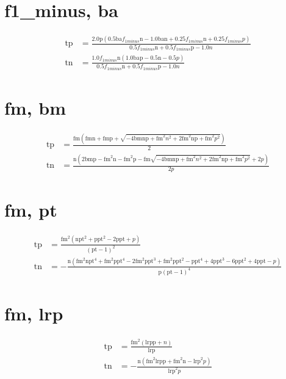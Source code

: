 \documentclass[3p,times]{elsarticle}
\begin{document}
\begin{footnotesize}
\begin{landscape}
\section{f1_minus, ba}
\begin{align}
\mathrm{tp} &= \frac{2.0 \mathrm{p} \left(0.5 \mathrm{ba} f_{1 minus} \mathrm{n} - 1.0 \mathrm{ba} \mathrm{n} + 0.25 f_{1 minus} \mathrm{n} + 0.25 f_{1 minus} p\right)}{0.5 f_{1 minus} \mathrm{n} + 0.5 f_{1 minus} \mathrm{p} - 1.0 n}\\
\mathrm{tn} &= \frac{1.0 f_{1 minus} \mathrm{n} \left(1.0 \mathrm{ba} \mathrm{p} - 0.5 \mathrm{n} - 0.5 p\right)}{0.5 f_{1 minus} \mathrm{n} + 0.5 f_{1 minus} \mathrm{p} - 1.0 n}
\end{align}
\section{fm, bm}
\begin{align}
\mathrm{tp} &= \frac{\mathrm{fm} \left(\mathrm{fm} \mathrm{n} + \mathrm{fm} \mathrm{p} + \sqrt{- 4 \mathrm{bm} \mathrm{n} \mathrm{p} + \mathrm{fm}^{2} n^{2} + 2 \mathrm{fm}^{2} \mathrm{n} \mathrm{p} + \mathrm{fm}^{2} p^{2}}\right)}{2}\\
\mathrm{tn} &= \frac{\mathrm{n} \left(2 \mathrm{bm} \mathrm{p} - \mathrm{fm}^{2} \mathrm{n} - \mathrm{fm}^{2} \mathrm{p} - \mathrm{fm} \sqrt{- 4 \mathrm{bm} \mathrm{n} \mathrm{p} + \mathrm{fm}^{2} n^{2} + 2 \mathrm{fm}^{2} \mathrm{n} \mathrm{p} + \mathrm{fm}^{2} p^{2}} + 2 p\right)}{2 p}
\end{align}
\section{fm, pt}
\begin{align}
\mathrm{tp} &= \frac{\mathrm{fm}^{2} \left(\mathrm{n} \mathrm{pt}^{2} + \mathrm{p} \mathrm{pt}^{2} - 2 \mathrm{p} \mathrm{pt} + p\right)}{\left(\mathrm{pt} - 1\right)^{2}}\\
\mathrm{tn} &= - \frac{\mathrm{n} \left(\mathrm{fm}^{2} \mathrm{n} \mathrm{pt}^{4} + \mathrm{fm}^{2} \mathrm{p} \mathrm{pt}^{4} - 2 \mathrm{fm}^{2} \mathrm{p} \mathrm{pt}^{3} + \mathrm{fm}^{2} \mathrm{p} \mathrm{pt}^{2} - \mathrm{p} \mathrm{pt}^{4} + 4 \mathrm{p} \mathrm{pt}^{3} - 6 \mathrm{p} \mathrm{pt}^{2} + 4 \mathrm{p} \mathrm{pt} - p\right)}{\mathrm{p} \left(\mathrm{pt} - 1\right)^{4}}
\end{align}
\section{fm, lrp}
\begin{align}
\mathrm{tp} &= \frac{\mathrm{fm}^{2} \left(\mathrm{lrp} \mathrm{p} + n\right)}{\mathrm{lrp}}\\
\mathrm{tn} &= - \frac{\mathrm{n} \left(\mathrm{fm}^{2} \mathrm{lrp} \mathrm{p} + \mathrm{fm}^{2} \mathrm{n} - \mathrm{lrp}^{2} p\right)}{\mathrm{lrp}^{2} p}
\end{align}

\end{landscape}
\end{footnotesize}
\end{document}
